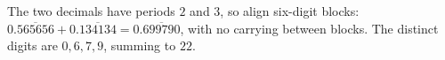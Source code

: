 The two decimals have periods $2$ and $3$, so align six-digit blocks: $0.\overline{565656}+0.\overline{134134}=0.\overline{699790}$, with no carrying between blocks. The distinct digits are $0,6,7,9$, summing to $\boxed{22}$.
